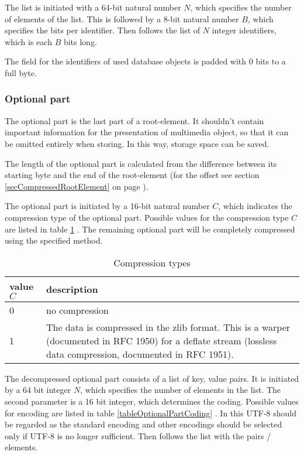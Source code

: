 The list is initiated with a 64-bit natural number $N$, which specifies the number of elements of the list. This is followed by a 8-bit natural number $B$, which specifies the bits per identifier.
Then follows the list of $N$ integer identifiers, which is each $B$ bits long.

The field for the identifiers of used database objects is padded with 0 bits to a full byte.


\subsubsection{Optional part}
\label{secCompressedRootOptionalPart}

The optional part is the last part of a root-element. It shouldn't contain important information for the presentation of multimedia object, so that it can be omitted entirely when storing. In this way, storage space can be saved.

The length of the optional part is calculated from the difference between its starting byte and the end of the root-element (for the offset see section \ref{secCompressedRootElement} on page \pageref{secCompressedRootElement}).

The optional part is initiated by a 16-bit natural number $C$, which indicates the compression type of the optional part. Possible values for the compression type $C$ are listed in table \ref{tableOptionalPartCompressing} . The remaining optional part will be completely compressed using the specified method.

\begin{table}[htbp]
\begin{center}
\begin{tabular}{|p{15mm}|p{100mm}|}\hline
	value $C$ & description \\\hline\hline
	0 & no compression\\\hline
	1 & The data is compressed in the zlib format. This is a warper (documented in RFC 1950) for a deflate stream (lossless data compression, documented in RFC 1951). \\\hline

\end{tabular}
\end{center}
\caption{Compression types}
\label{tableOptionalPartCompressing}
\end{table}

The decompressed optional part consists of a list of key, value pairs. It is initiated by a 64 bit integer $N$, which specifies the number of elements in the list. The second parameter is a 16 bit integer, which determines the coding. Possible values for encoding are listed in table \ref{tableOptionalPartCoding} . In this UTF-8 should be regarded as the standard encoding and other encodings should be selected only if UTF-8 is no longer sufficient.
Then follows the list with the pairs / elements.

